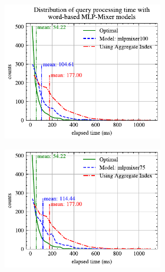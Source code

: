 \documentclass[conference]{IEEEtran}
\begin{document}
\begin{figure}[!h]
	\centering
	\begin{subfigure}{0.45\textwidth}
		\begin{subfigure}{\textwidth}
			\centering
			\includegraphics[]{graphics/perf_dist_mlpmixer100_B.pdf}
		\end{subfigure}
		\vfill
		\begin{subfigure}{\textwidth}
			\centering
			\includegraphics[]{graphics/perf_dist_mlpmixer75_B.pdf}
		\end{subfigure}
		\vfill
		\begin{subfigure}{\textwidth}
			\centering

\end{subfigure}
\end{subfigure}
\end{figure}
\end{document}
